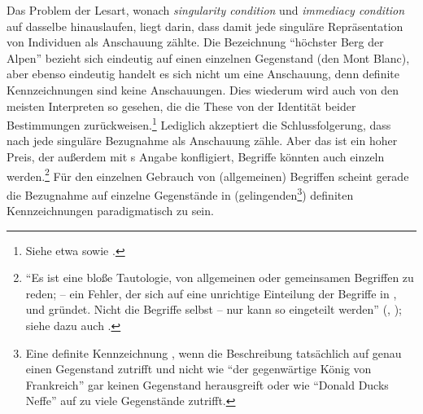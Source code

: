 Das Problem der Lesart, wonach \emph{singularity condition} und \emph{immediacy
condition} auf dasselbe hinauslaufen, liegt darin, dass damit jede singuläre
Repräsentation von Individuen als Anschauung zählte. Die Bezeichnung
\enquote{höchster Berg der Alpen} bezieht sich eindeutig auf einen einzelnen
Gegenstand (den Mont Blanc), aber ebenso eindeutig handelt es sich nicht um eine
Anschauung, denn definite Kennzeichnungen sind keine Anschauungen. Dies wiederum
wird auch von den meisten Interpreten so gesehen, die die These von der
Identität beider Bestimmungen  zurückweisen.\footnote{Siehe etwa
\cite[][\pno~207\,f.,]{Howell:IntuitionSynthesisandIndividuationintheCritiqueofPureReason1973}
sowie \cite[][70]{Parsons:KantsPhilosophyofArithmetic1992}.} Lediglich
 akzeptiert die
Schlussfolgerung, dass nach  jede singuläre Bezugnahme als Anschauung zähle.
Aber das ist ein hoher Preis, der außerdem mit s Angabe
konfligiert, Begriffe könnten auch einzeln 
werden.\footnote{\enquote{Es ist eine bloße Tautologie, von
allgemeinen oder gemeinsamen Begriffen zu reden; -- ein Fehler, der sich auf
eine unrichtige Einteilung der Begriffe in , 
und  gründet. Nicht die Begriffe selbst -- nur 
kann so eingeteilt werden}
\mkbibparens{\cite[][\S~1]{Kant:ImmanuelKantsLogik1977}, \cite[][IX:
91.17--20]{Kant:GesammelteWerke1900ff.}}; siehe dazu auch
\cite[][B 96\,f.,]{Kant:KritikderreinenVernunft2003}
\cite[][III: 87.20--88.2]{Kant:GesammelteWerke1900ff.}.} Für den
einzelnen Gebrauch von (allgemeinen) Begriffen scheint gerade die
Bezugnahme auf einzelne Gegenstände in (gelingenden\footnote{Eine definite Kennzeichnung
  , wenn die Beschreibung tatsächlich auf genau
  einen Gegenstand zutrifft und nicht wie \enquote{der gegenwärtige
    König von Frankreich} gar keinen Gegenstand herausgreift oder wie
  \enquote{Donald Ducks Neffe} auf zu viele Gegenstände zutrifft.})
definiten Kennzeichnungen paradigmatisch zu sein.

